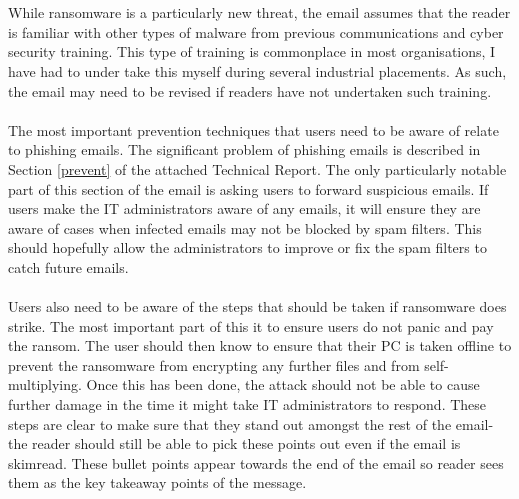 \documentclass{article}
\begin{document}
\\\\
While ransomware is a particularly new threat, the email assumes that the reader is familiar with other types of malware from previous communications and cyber security training. This type of training is commonplace in most organisations, I have had to under take this myself during several industrial placements. As such, the email may need to be revised if readers have not undertaken such training.
\\\\
The most important prevention techniques that users need to be aware of relate to phishing emails. The significant problem of phishing emails is described in Section \ref{prevent} of the attached Technical Report. 
The only particularly notable part of this section of the email is asking users to forward suspicious emails.
If users make the IT administrators aware of any emails, it will ensure they are aware of cases when infected emails may not be blocked by spam filters.
This should hopefully allow the administrators to improve or fix the spam filters to catch future emails.
\\\\
Users also need to be aware of the steps that should be taken if ransomware does strike. The most important part of this it to ensure users do not panic and pay the ransom. The user should then know to ensure that their PC is taken offline to prevent the ransomware from encrypting any further files and from self-multiplying. Once this has been done, the attack should not be able to cause further damage in the time it might take IT administrators to respond. These steps are clear to make sure that they stand out amongst the rest of the email- the reader should still be able to pick these points out even if the email is skimread. These bullet points appear towards the end of the email so reader sees them as the key takeaway points of the message.
\\\\
\end{document}

